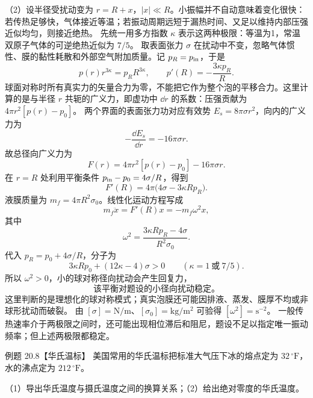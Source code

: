 \begin{xesolution}
（2）设半径受扰动变为 $r=R+x$，$|x|\ll R$。小振幅并不自动意味着变化很快：
若传热足够快，气体接近等温；若振动周期远短于漏热时间、又足以维持内部压强近似均匀，则接近绝热。
先统一用多方指数 $\kappa$ 表示这两种极限：等温为1，常温双原子气体的可逆绝热近似为 $7/5$。
取表面张力 $\sigma$ 在扰动中不变，忽略气体惯性、膜的黏性耗散和外部空气附加质量。记 $p_R=p_{\rm in}$，于是
\begin{equation*}
  p(r)r^{3\kappa}=p_R R^{3\kappa},
  \qquad
  p'(R)=-\frac{3\kappa p_R}{R}.
\end{equation*}
球面对称时所有真实力的矢量合力为零，不能把它作为整个泡的平移合力。这里计算的是与半径 $r$
共轭的广义力，即虚功中 $\dd r$ 的系数：压强贡献为 $4\pi r^2[p(r)-p_0]$。
两个界面的表面张力功对应有效势 $E_s=8\pi\sigma r^2$，向内的广义力为
\begin{equation*}
  -\frac{\dd E_s}{\dd r}=-16\pi\sigma r.
\end{equation*}
故总径向广义力为
\begin{equation*}
  F(r)=4\pi r^2[p(r)-p_0]-16\pi\sigma r.
\end{equation*}
在 $r=R$ 处利用平衡条件 $p_{\rm in}-p_0=4\sigma/R$，得到
\begin{equation*}
  F'(R)=4\pi\bigl(4\sigma-3\kappa Rp_R\bigr).
\end{equation*}
液膜质量为 $m_f=4\pi R^2\sigma_0$。线性化运动方程写成
\begin{equation*}
  m_f\ddot x=F'(R)x=-m_f\omega^2x,
\end{equation*}
其中
\begin{equation}
  \boxed{\omega^2=
  \frac{3\kappa Rp_R-4\sigma}{R^2\sigma_0}}.
\end{equation}
代入 $p_R=p_0+4\sigma/R$，分子为
\begin{equation*}
  3\kappa Rp_0+(12\kappa-4)\sigma>0\qquad(\kappa=1\ \text{或}\ 7/5).
\end{equation*}
所以 $\omega^2>0$，小的球对称径向扰动会产生回复力，
\begin{equation*}
  \boxed{\text{该平衡对题设的小径向扰动稳定。}}
\end{equation*}
这里判断的是理想化的球对称模式；真实泡膜还可能因排液、蒸发、膜厚不均或非球形扰动而破裂。
由 $[\sigma]=\mathrm{N/m}$、$[\sigma_0]=\mathrm{kg/m^2}$ 可验得 $[\omega^2]=\mathrm{s^{-2}}$。
一般传热速率介于两极限之间时，还可能出现相位滞后和阻尼，题设不足以指定唯一振动频率；但上述两极限都稳定。
\end{xesolution}

\begin{origexamplebox}{例题 20.8【华氏温标】}
美国常用的华氏温标把标准大气压下冰的熔点定为 $32\,{}^\circ\mathrm F$，水的沸点定为
$212\,{}^\circ\mathrm F$。

（1）导出华氏温度与摄氏温度之间的换算关系；（2）给出绝对零度的华氏温度。
\end{origexamplebox}

